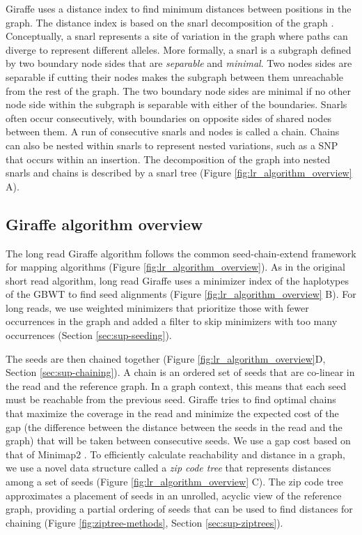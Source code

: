 \documentclass[11pt]{ucscthesis}
\begin{document}
Giraffe uses a distance index \citep{chang_distance_2020} to find minimum distances between positions in the graph.
The distance index is based on the snarl decomposition of the graph \cite{paten_superbubbles_2018}.
Conceptually, a snarl represents a site of variation in the graph where paths can diverge to represent different alleles.
More formally, a snarl is a subgraph defined by two boundary node sides that are \emph{separable} and \emph{minimal}.
Two nodes sides are separable if cutting their nodes makes the subgraph between them unreachable from the rest of the graph.
The two boundary node sides are minimal if no other node side within the subgraph is separable with either of the boundaries. 
Snarls often occur consecutively, with boundaries on opposite sides of shared nodes between them.
A run of consecutive snarls and nodes is called a chain.
Chains can also be nested within snarls to represent nested variations, such as a SNP that occurs within an insertion.
The decomposition of the graph into nested snarls and chains is described by a snarl tree (Figure \ref{fig:lr_algorithm_overview} A). 

\subsection{Giraffe algorithm overview}

The long read Giraffe algorithm follows the common seed-chain-extend framework \citep{sahlin_survey_2023} for mapping algorithms (Figure \ref{fig:lr_algorithm_overview}).
As in the original short read algorithm, long read Giraffe uses a minimizer index of the haplotypes of the GBWT to find seed alignments (Figure \ref{fig:lr_algorithm_overview} B).
For long reads, we use weighted minimizers that prioritize those with fewer occurrences in the graph and added a filter to skip minimizers with too many occurrences (Section \ref{sec:sup-seeding}). 

The seeds are then chained together (Figure \ref{fig:lr_algorithm_overview}D, Section \ref{sec:sup-chaining}).
A chain is an ordered set of seeds that are co-linear in the read and the reference graph.
In a graph context, this means that each seed must be reachable from the previous seed.
Giraffe tries to find optimal chains that maximize the coverage in the read and minimize the expected cost of the gap (the difference between the distance between the seeds in the read and the graph) that will be taken between consecutive seeds. 
We use a gap cost based on that of Minimap2 \cite{minimap2_2021}.
To efficiently calculate reachability and distance in a graph, we use a novel data structure called a \emph{zip code tree} that represents distances among a set of seeds (Figure \ref{fig:lr_algorithm_overview} C).
The zip code tree approximates a placement of seeds in an unrolled, acyclic view of the reference graph, providing a partial ordering of seeds that can be used to find distances for chaining (Figure \ref{fig:ziptree-methods}, Section \ref{sec:sup-ziptrees}).
\end{document}
